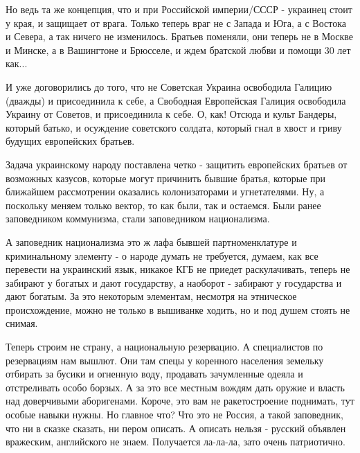 Но ведь та же концепция, что и при Российской империи/СССР - украинец стоит у
края, и защищает от врага. Только теперь враг не с Запада и Юга, а с Востока и
Севера, а так ничего не изменилось. Братьев поменяли, они теперь не в Москве и
Минске, а в Вашингтоне и Брюсселе, и ждем братской любви и помощи 30 лет как... 

И уже договорились до того, что не Советская Украина освободила Галицию
(дважды) и присоединила к себе, а Свободная Европейская Галиция освободила
Украину от Советов, и присоединила к себе. О, как! Отсюда и культ Бандеры,
который батько, и осуждение советского солдата, который гнал в хвост и гриву
будущих европейских братьев. 

Задача украинскому народу поставлена четко - защитить европейских братьев от
возможных казусов, которые могут причинить бывшие братья, которые при ближайшем
рассмотрении оказались колонизаторами и угнетателями. Ну, а поскольку меняем
только вектор, то как были, так и остаемся. Были ранее заповедником коммунизма,
стали заповедником национализма. 

А заповедник национализма это ж лафа бывшей партноменклатуре и криминальному
элементу - о народе думать не требуется, думаем, как все перевести на
украинский язык, никакое КГБ не приедет раскулачивать, теперь не забирают у
богатых и дают государству, а наоборот - забирают у государства и дают богатым.
За это некоторым элементам, несмотря на этническое происхождение, можно не
только в вышиванке ходить, но и под душем стоять не снимая. 

Теперь строим не страну, а национальную резервацию. А специалистов по
резервациям нам вышлют. Они там спецы у коренного населения земельку отбирать
за бусики и огненную воду, продавать зачумленные одеяла и отстреливать особо
борзых. А за это все местным вождям дать оружие и власть над доверчивыми
аборигенами. Короче, это вам не ракетостроение поднимать, тут особые навыки
нужны. Но главное что? Что это не Россия, а такой заповедник, что ни в сказке
сказать, ни пером описать. А описать нельзя - русский объявлен вражеским,
английского не знаем. Получается ла-ла-ла, зато очень патриотично.

